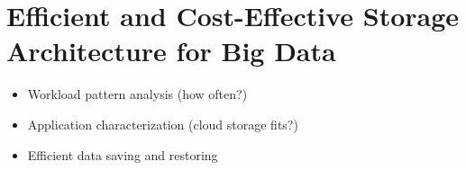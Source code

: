 \section{Efficient and Cost-Effective Storage Architecture for Big Data}
\label{sec:storage}

\begin{itemize}
  \item Workload pattern analysis (how often?)
  \item Application characterization (cloud storage fits?)
  \item Efficient data saving and restoring
\end{itemize}
